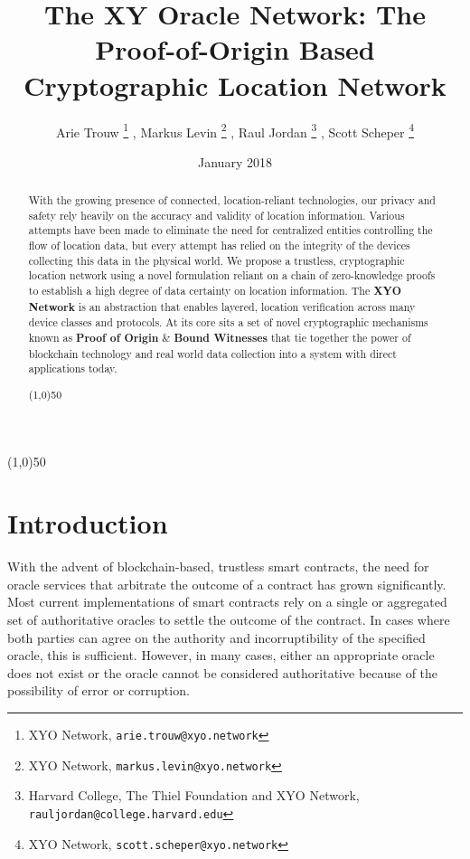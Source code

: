 \documentclass{article}
\title {The XY Oracle Network: The Proof-of-Origin Based Cryptographic Location Network}
\author{
	Arie Trouw
		\thanks{XYO Network, \texttt{arie.trouw@xyo.network}}
	, Markus Levin
		\thanks{XYO Network, \texttt{markus.levin@xyo.network}}
	, Raul Jordan
		\thanks{Harvard College, The Thiel Foundation and XYO Network, \texttt{rauljordan@college.harvard.edu}}
	, Scott Scheper
		\thanks{XYO Network, \texttt{scott.scheper@xyo.network}}
}
\date{January 2018}
\begin{document}
\maketitle

\begin{center}
\line(1,0){50}
\end{center}

\begin{abstract}
With the growing presence of connected, location-reliant technologies, our privacy and safety rely heavily on the accuracy and validity of location information. Various attempts have been made to eliminate the need for centralized entities controlling the flow of location data, but every attempt has relied on the integrity of the devices collecting this data in the physical world.
We propose a trustless, cryptographic location network using a novel formulation reliant on a chain of zero-knowledge proofs to establish a high degree of data certainty on location information.
The \textbf{XYO Network} is an abstraction that enables layered, location verification across many device classes and protocols. At its core sits a set of novel cryptographic mechanisms known as \textbf{Proof of Origin} \& \textbf{Bound Witnesses} that tie together the power of blockchain technology and real world data collection into a system with direct applications today.

\begin{center}
\line(1,0){50}
\end{center}
\end{abstract}

\section{Introduction}
With the advent of blockchain-based, trustless smart contracts, the need for oracle services
that arbitrate the outcome of a contract has grown significantly. Most current implementations
of smart contracts rely on a single or aggregated set of authoritative oracles to settle
the outcome of the contract. In cases where both parties can agree on the authority and
incorruptibility of the specified oracle, this is sufficient. However, in many cases, either
an appropriate oracle does not exist or the oracle cannot be considered
authoritative because of the possibility of error or corruption.
\end{document}
